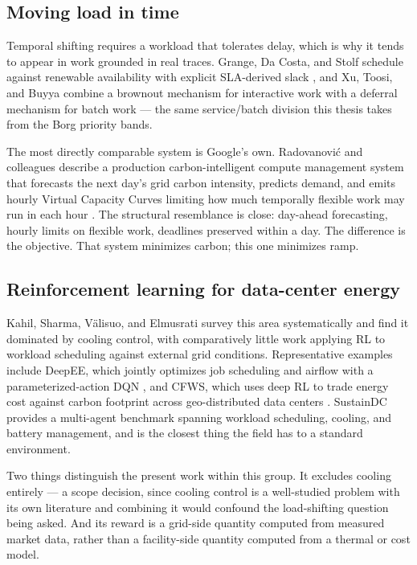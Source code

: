 ﻿\documentclass[12pt]{article}
\begin{document}
\subsection{Moving load in time}
\label{subsec:related-time}

Temporal shifting requires a workload that tolerates delay, which is why it
tends to appear in work grounded in real traces. Grange, Da Costa, and Stolf
schedule against renewable availability with explicit SLA-derived slack
\cite{grange2018green}, and Xu, Toosi, and Buyya combine a brownout mechanism
for interactive work with a deferral mechanism for batch work
\cite{xu2021selfadaptive} --- the same service/batch division this thesis takes
from the Borg priority bands.

The most directly comparable system is Google's own. Radovanovi\'{c} and
colleagues describe a production carbon-intelligent compute management system
that forecasts the next day's grid carbon intensity, predicts demand, and emits
hourly Virtual Capacity Curves limiting how much temporally flexible work may
run in each hour \cite{radovanovic2023carbon}. The structural resemblance is
close: day-ahead forecasting, hourly limits on flexible work, deadlines
preserved within a day. The difference is the objective. That system minimizes
carbon; this one minimizes ramp.

\subsection{Reinforcement learning for data-center energy}
\label{subsec:related-rl}

Kahil, Sharma, Välisuo, and Elmusrati survey this area systematically
\cite{kahil2025rlreview} and find it dominated by cooling control, with
comparatively little work applying RL to workload scheduling against external
grid conditions. Representative examples include DeepEE, which jointly optimizes
job scheduling and airflow with a parameterized-action DQN
\cite{ran2019deepee}, and CFWS, which uses deep RL to trade energy cost against
carbon footprint across geo-distributed data centers
\cite{zhao2025cfws}. SustainDC \cite{naug2024sustaindc} provides a multi-agent
benchmark spanning workload scheduling, cooling, and battery management, and is
the closest thing the field has to a standard environment.

Two things distinguish the present work within this group. It excludes cooling
entirely --- a scope decision, since cooling control is a well-studied problem
with its own literature \cite{zhang2021cooling, zhang2016joint} and combining it
would confound the load-shifting question being asked. And its reward is a
grid-side quantity computed from measured market data, rather than a
facility-side quantity computed from a thermal or cost model.
\end{document}
